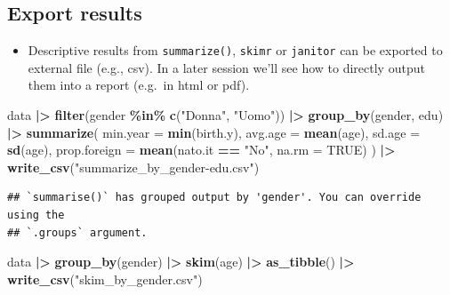 \documentclass[
]{book}
\newenvironment{Shaded}{\begin{snugshade}}{\end{snugshade}}
\newcommand{\AttributeTok}[1]{\textcolor[rgb]{0.13,0.29,0.53}{#1}}
\newcommand{\ConstantTok}[1]{\textcolor[rgb]{0.56,0.35,0.01}{#1}}
\newcommand{\FunctionTok}[1]{\textcolor[rgb]{0.13,0.29,0.53}{\textbf{#1}}}
\newcommand{\NormalTok}[1]{#1}
\newcommand{\SpecialCharTok}[1]{\textcolor[rgb]{0.81,0.36,0.00}{\textbf{#1}}}
\newcommand{\StringTok}[1]{\textcolor[rgb]{0.31,0.60,0.02}{#1}}
\providecommand{\tightlist}{%
  \setlength{\itemsep}{0pt}\setlength{\parskip}{0pt}}
\begin{document}
\hypertarget{export-results}{%
\subsection{Export results}\label{export-results}}

\begin{itemize}
\tightlist
\item
  Descriptive results from \texttt{summarize()}, \texttt{skimr} or \texttt{janitor} can be exported to external file (e.g., csv). In a later session we'll see how to directly output them into a report (e.g.~in html or pdf).
\end{itemize}

\begin{Shaded}
\begin{Highlighting}[]
\NormalTok{data }\SpecialCharTok{|\textgreater{}} 
  \FunctionTok{filter}\NormalTok{(gender }\SpecialCharTok{\%in\%} \FunctionTok{c}\NormalTok{(}\StringTok{"Donna"}\NormalTok{, }\StringTok{"Uomo"}\NormalTok{)) }\SpecialCharTok{|\textgreater{}} 
  \FunctionTok{group\_by}\NormalTok{(gender, edu) }\SpecialCharTok{|\textgreater{}} 
  \FunctionTok{summarize}\NormalTok{(}
    \AttributeTok{min.year =} \FunctionTok{min}\NormalTok{(birth.y),}
    \AttributeTok{avg.age =} \FunctionTok{mean}\NormalTok{(age),}
    \AttributeTok{sd.age =} \FunctionTok{sd}\NormalTok{(age),}
    \AttributeTok{prop.foreign =} \FunctionTok{mean}\NormalTok{(nato.it }\SpecialCharTok{==} \StringTok{"No"}\NormalTok{, }\AttributeTok{na.rm =} \ConstantTok{TRUE}\NormalTok{)}
\NormalTok{  ) }\SpecialCharTok{|\textgreater{}} 
  \FunctionTok{write\_csv}\NormalTok{(}\StringTok{"summarize\_by\_gender{-}edu.csv"}\NormalTok{)}
\end{Highlighting}
\end{Shaded}

\begin{verbatim}
## `summarise()` has grouped output by 'gender'. You can override using the
## `.groups` argument.
\end{verbatim}

\begin{Shaded}
\begin{Highlighting}[]
\NormalTok{data }\SpecialCharTok{|\textgreater{}} 
  \FunctionTok{group\_by}\NormalTok{(gender) }\SpecialCharTok{|\textgreater{}} 
  \FunctionTok{skim}\NormalTok{(age) }\SpecialCharTok{|\textgreater{}} 
  \FunctionTok{as\_tibble}\NormalTok{() }\SpecialCharTok{|\textgreater{}} 
  \FunctionTok{write\_csv}\NormalTok{(}\StringTok{"skim\_by\_gender.csv"}\NormalTok{)}
\end{Highlighting}
\end{Shaded}
\end{document}

